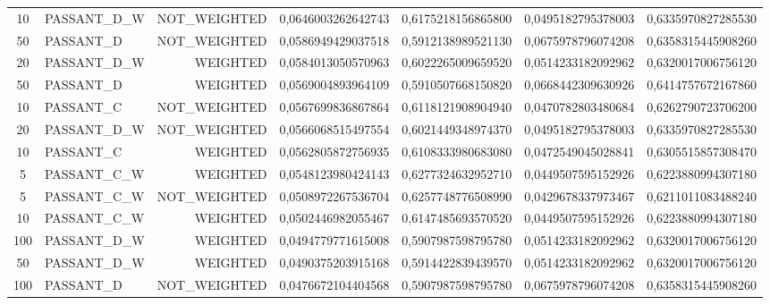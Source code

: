 \begin{table}[H]
{\begin{tabular}{ c l r c c c c }
				10 & PASSANT\_D\_W & NOT\_WEIGHTED & 0,0646003262642743 & 0,6175218156865800 & 0,0495182795378003 & 0,6335970827285530 \\
				
				50 &  PASSANT\_D & NOT\_WEIGHTED & 0,0586949429037518 & 0,5912138989521130 & 0,0675978796074208 & 0,6358315445908260 \\
				
				20 & PASSANT\_D\_W &   WEIGHTED & 0,0584013050570963 & 0,6022265009659520 & 0,0514233182092962 & 0,6320017006756120 \\
				
				50 &  PASSANT\_D &   WEIGHTED & 0,0569004893964109 & 0,5910507668150820 & 0,0668442309630926 & 0,6414757672167860 \\
				
				10 &  PASSANT\_C & NOT\_WEIGHTED & 0,0567699836867864 & 0,6118121908904940 & 0,0470782803480684 & 0,6262790723706200 \\
				
				20 & PASSANT\_D\_W & NOT\_WEIGHTED & 0,0566068515497554 & 0,6021449348974370 & 0,0495182795378003 & 0,6335970827285530 \\
				
				10 &  PASSANT\_C &   WEIGHTED & 0,0562805872756935 & 0,6108333980683080 & 0,0472549045028841 & 0,6305515857308470 \\
				
				5 & PASSANT\_C\_W &   WEIGHTED & 0,0548123980424143 & 0,6277324632952710 & 0,0449507595152926 & 0,6223880994307180 \\
				
				5 & PASSANT\_C\_W & NOT\_WEIGHTED & 0,0508972267536704 & 0,6257748776508990 & 0,0429678337973467 & 0,6211011083488240 \\
				
				10 & PASSANT\_C\_W &   WEIGHTED & 0,0502446982055467 & 0,6147485693570520 & 0,0449507595152926 & 0,6223880994307180 \\
				
				100 & PASSANT\_D\_W &   WEIGHTED & 0,0494779771615008 & 0,5907987598795780 & 0,0514233182092962 & 0,6320017006756120 \\
				
				50 & PASSANT\_D\_W &   WEIGHTED & 0,0490375203915168 & 0,5914422839439570 & 0,0514233182092962 & 0,6320017006756120 \\
				
				100 &  PASSANT\_D & NOT\_WEIGHTED & 0,0476672104404568 & 0,5907987598795780 & 0,0675978796074208 & 0,6358315445908260 \\
				

\end{tabular}}
\end{table}
